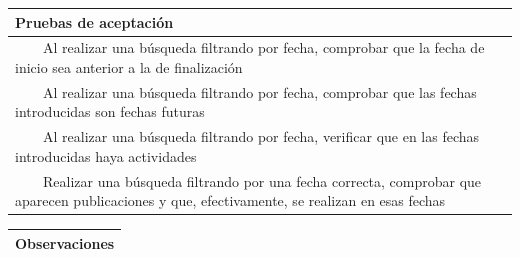 \documentclass[11pt]{article}
\newcommand{\tabitem}{~~\llap{\textbullet}~~}
\begin{document}
  \begin{longtable}{p{1.028\linewidth}}
    \textbf{Pruebas de aceptación}\\
    \midrule
    \tabitem Al realizar una búsqueda filtrando por fecha, comprobar que la fecha de inicio sea anterior a la de finalización\\
    \tabitem Al realizar una búsqueda filtrando por fecha, comprobar que las fechas introducidas son fechas futuras\\
    \tabitem Al realizar una búsqueda filtrando por fecha, verificar que en las fechas introducidas haya actividades\\
    \tabitem Realizar una búsqueda filtrando por una fecha correcta, comprobar que aparecen publicaciones y que, efectivamente, se realizan en esas fechas\\
\end{longtable}
\begin{longtable}{p{1.028\linewidth}}
  \textbf{Observaciones}\\
  \midrule
  \bottomrule
  \bottomrule
\end{longtable}
\end{document}
